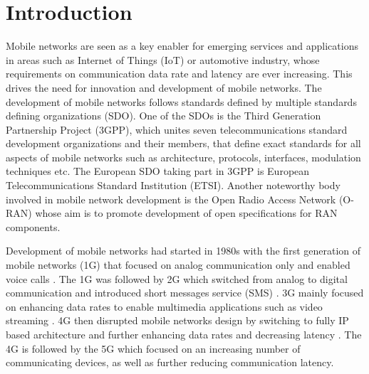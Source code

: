 \documentclass[12pt,a4paper,twoside]{report}
\begin{document}
\tableofcontents			

\glsaddallunused
\printglossary[type=\acronymtype,title={List of Abbreviations}]	%



\newpage

\setcounter{page}{1}

\chapter{Introduction}
Mobile networks are seen as a key enabler for emerging services and applications in areas such as Internet of Things (IoT) or automotive industry, whose requirements on communication data rate and latency are ever increasing. This drives the need for innovation and development of mobile networks. The development of mobile networks follows standards defined by multiple standards defining organizations (SDO). One of the SDOs is the Third Generation Partnership Project (3GPP), which unites seven telecommunications standard development organizations and their members, that define exact standards for all aspects of mobile networks such as architecture, protocols, interfaces, modulation techniques etc. The European SDO taking part in 3GPP is European Telecommunications Standard Institution (ETSI). Another noteworthy body involved in mobile network development is the Open Radio Access Network (O-RAN) whose aim is to promote development of open specifications for RAN components.

Development of mobile networks had started in 1980s with the first generation of mobile networks (1G) that focused on analog communication only and enabled voice calls \cite{sauter2017history}. The 1G was followed by 2G which switched from analog to digital communication and introduced short messages service (SMS) \cite{sauter2017history}. 3G mainly focused on enhancing data rates to enable multimedia applications such as video streaming \cite{sauter2017history}. 4G then disrupted mobile networks design by switching to fully IP based architecture and further enhancing data rates and decreasing latency \cite{sauter2017history,dahlman-2013-4g} . The 4G is followed by the 5G which focused on an increasing number of communicating devices, as well as further reducing communication latency.
\end{document}
